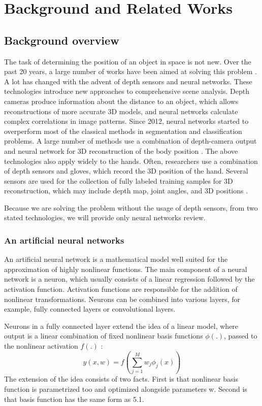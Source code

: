 
\chapter{Background and Related Works}

\section{Background overview}

The task of determining the position of an object in space is not new. Over the past 20 years, a large number of works have been aimed at solving this problem \cite{6, 7}. A lot has changed with the advent of depth sensors and neural networks. These technologies introduce new approaches to comprehensive scene analysis. Depth cameras produce information about the distance to an object, which allows reconstructions of more accurate 3D models, and neural networks calculate complex correlations in image patterns. Since 2012, neural networks started to overperform most of the classical methods in segmentation and classification problems. A large number of methods use a combination of depth-camera output and neural network for 3D reconstruction of the body position \cite{8, 9}. The above technologies also apply widely to the hands. Often, researchers use a combination of depth sensors and gloves, which record the 3D position of the hand. Several sensors are used for the collection of fully labeled training samples for 3D reconstruction, which may include depth map, joint angles, and 3D positions \cite{1,2,3}.  

Because we are solving the problem without the usage of depth sensors, from two stated technologies, we will provide only neural networks review.

\subsection{An artificial neural networks} 

An artificial neural network is a mathematical model well suited for the approximation of highly nonlinear functions. The main component of a neural network is a neuron, which usually consists of a linear regression followed by the activation function. Activation functions are responsible for the addition of nonlinear transformations. Neurons can be combined into various layers, for example, fully connected layers or convolutional layers. 

Neurons in a fully connected layer extend the idea of a linear model, where output is a linear combination of fixed nonlinear basis functions \(\phi(.)\), passed to the nonlinear activation \(f(.)\) \cite{BISHOP}:
\begin{equation}
y(x,w) = f(\sum_{j=1}^{M}w_{j}\phi_{j}(x))
\end{equation}
The extension of the idea consists of two facts. First is that nonlinear basis function is parametrized too and optimized alongside parameters {w}. Second is that basis function has the same form as 5.1.\cite{BISHOP}

